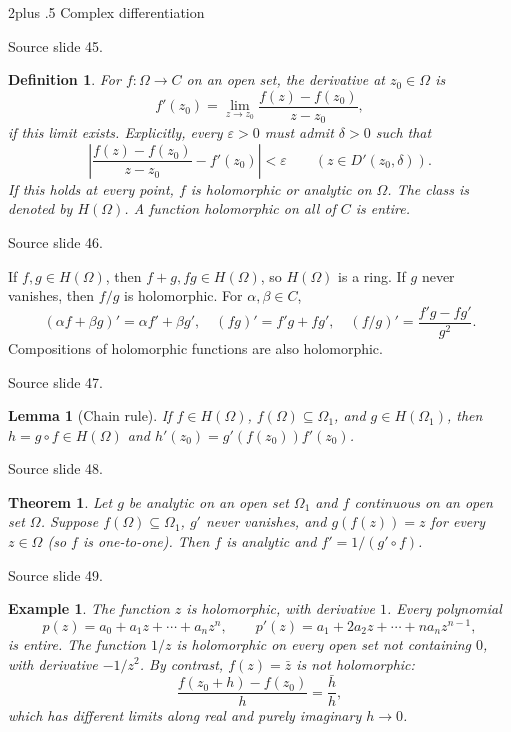 \documentclass[10pt,letterpaper,twoside,openright]{amsbook}
\makeatletter
\numberwithin{equation}{subsection}
\renewcommand{\section}{\@startsection{section}{1}
 {\z@}{2\baselineskip plus .5\baselineskip}
 {\baselineskip}{\normalfont\Large\bfseries\centering}}
\theoremstyle{sea-plain}
\newtheorem{theorem}[subsection]{Theorem}
\newtheorem{lemma}[subsection]{Lemma}
\theoremstyle{sea-definition}
\newtheorem{definition}[subsection]{Definition}
\newtheorem{example}[subsection]{Example}
\theoremstyle{sea-exercise}
\newcommand{\RR}{\mathbb{R}}
\newcommand{\CC}{\mathbb{C}}
\newcommand{\DD}{\mathbb{D}}
\newcommand{\HH}{\mathbb{H}}
\newcommand{\Chat}{\mathbb{C}_{\infty}}
\newcommand{\Hol}{H}
\def\CC{C}\def\RR{R}\def\DD{D}\def\HH{H}\def\Chat{C infinity}}
\newcommand{\src}[1]{\par\smallskip\noindent
 {\scriptsize\sffamily\color{SoftWhite}Source slide #1.}\par\nopagebreak\smallskip}
\makeatother
\begin{document}
\section{Complex differentiation}
\src{45}
\begin{definition}
For $f:\Omega\to\CC$ on an open set, the derivative at $z_0\in\Omega$ is
\[
 f'(z_0)=\lim_{z\to z_0}\frac{f(z)-f(z_0)}{z-z_0},
\]
if this limit exists. Explicitly, every $\varepsilon>0$ must admit $\delta>0$
such that
\[
 \left|\frac{f(z)-f(z_0)}{z-z_0}-f'(z_0)\right|<\varepsilon
 \qquad(z\in D'(z_0,\delta)).
\]
If this holds at every point, $f$ is holomorphic or analytic on $\Omega$.
The class is denoted by $\Hol(\Omega)$. A function holomorphic on all of
$\CC$ is entire.
\end{definition}
\src{46}
If $f,g\in\Hol(\Omega)$, then $f+g,fg\in\Hol(\Omega)$, so
$\Hol(\Omega)$ is a ring. If $g$ never vanishes, then $f/g$ is holomorphic.
For $\alpha,\beta\in\CC$,
\[
 (\alpha f+\beta g)'=\alpha f'+\beta g',\quad
 (fg)'=f'g+fg',\quad (f/g)'=\frac{f'g-fg'}{g^2}.
\]
Compositions of holomorphic functions are also holomorphic.
\src{47}
\begin{lemma}[Chain rule]
If $f\in\Hol(\Omega)$, $f(\Omega)\subseteq\Omega_1$, and
$g\in\Hol(\Omega_1)$, then $h=g\circ f\in\Hol(\Omega)$ and
$h'(z_0)=g'(f(z_0))f'(z_0)$.
\end{lemma}
\src{48}
\begin{theorem}
Let $g$ be analytic on an open set $\Omega_1$ and $f$ continuous on an
open set $\Omega$. Suppose $f(\Omega)\subseteq\Omega_1$, $g'$ never
vanishes, and $g(f(z))=z$ for every $z\in\Omega$ (so $f$ is one-to-one).
Then $f$ is analytic and $f'=1/(g'\circ f)$.
\end{theorem}
\src{49}
\begin{example}
The function $z$ is holomorphic, with derivative $1$. Every polynomial
\[
 p(z)=a_0+a_1z+\cdots+a_nz^n,\qquad
 p'(z)=a_1+2a_2z+\cdots+na_nz^{n-1},
\]
is entire. The function $1/z$ is holomorphic on every open set not containing
$0$, with derivative $-1/z^2$. By contrast, $f(z)=\bar z$ is not holomorphic:
\[
 \frac{f(z_0+h)-f(z_0)}h=\frac{\bar h}{h},
\]
which has different limits along real and purely imaginary $h\to0$.
\end{example}
\end{document}
